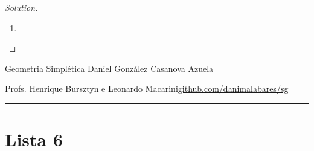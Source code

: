 \begin{proof}[Solution]
\begin{enumerate}[label=\alph*.]
		\item  
	\end{enumerate}
\end{proof}

\clearpage
\begin{minipage}{\textwidth}
	\begin{minipage}{1\textwidth}
		Geometria Simpl\'etica \hfill Daniel González Casanova Azuela
		
		{\small Profs. Henrique Bursztyn e Leonardo Macarini\hfill\href{https://github.com/danimalabares/sg}{github.com/danimalabares/sg}}
	\end{minipage}
\end{minipage}\vspace{.2cm}\hrule

\vspace{10pt}
\section{Lista 6}


